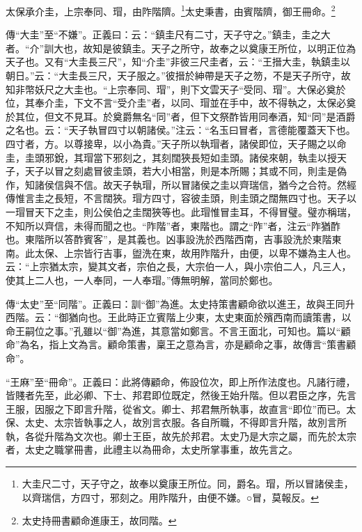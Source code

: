 太保承介圭，上宗奉同、瑁，由阼階隮。\footnote{大圭尺二寸，天子守之，故奉以奠康王所位。同，爵名。瑁，所以冒諸侯圭，以齊瑞信，方四寸，邪刻之。用阼階升，由便不嫌。○冒，莫報反。}太史秉書，由賓階隮，御王冊命。\footnote{太史持冊書顧命進康王，故同階。}

{\noindent\zhuan{}\fzbyks 傳“大圭”至“不嫌”。正義曰：云：“鎮圭尺有二寸，天子守之。”鎮圭，圭之大者。“介”訓大也，故知是彼鎮圭。天子之所守，故奉之以奠康王所位，以明正位為天子也。又有“大圭長三尺”，知“介圭”非彼三尺圭者，云：“王搢大圭，執鎮圭以朝日。”云：“大圭長三尺，天子服之。”彼搢於紳帶是天子之笏，不是天子所守，故知非幣妖尺之大圭也。“上宗奉同、瑁”，則下文雲天子“受同、瑁”。大保必奠於位，其奉介圭，下文不言“受介圭”者，以同、瑁並在手中，故不得執之，太保必奠於其位，但文不見耳。於奠爵無名“同”者，但下文祭酢皆用同奉酒，知“同”是酒爵之名也。云：“天子執冒四寸以朝諸侯。”注云：“名玉曰冒者，言德能覆蓋天下也。四寸者，方。以尊接卑，以小為貴。”天子所以執瑁者，諸侯即位，天子賜之以命圭，圭頭邪銳，其瑁當下邪刻之，其刻闊狹長短如圭頭。諸侯來朝，執圭以授天子，天子以冒之刻處冒彼圭頭，若大小相當，則是本所賜；其或不同，則圭是偽作，知諸侯信與不信。故天子執瑁，所以冒諸侯之圭以齊瑞信，猶今之合符。然經傳惟言圭之長短，不言闊狹。瑁方四寸，容彼圭頭，則圭頭之闊無四寸也。天子以一瑁冒天下之圭，則公侯伯之圭闊狹等也。此瑁惟冒圭耳，不得冒璧。璧亦稱瑞，不知所以齊信，未得而聞之也。“阼階”者，東階也。謂之“阼”者，注云“阼猶酢也。東階所以答酢賓客”，是其義也。凶事設洗於西階西南，吉事設洗於東階東南。此太保、上宗皆行吉事，盥洗在東，故用阼階升，由便，以卑不嫌為主人也。云：“上宗猶太宗，變其文者，宗伯之長，大宗伯一人，與小宗伯二人，凡三人，使其上二人也，一人奉同，一人奉瑁。”傳無明解，當同於鄭也。 \par}

{\noindent\zhuan{}\fzbyks 傳“太史”至“同階”。正義曰：訓“御”為進。太史持策書顧命欲以進王，故與王同升西階。云：“御猶向也。王此時正立賓階上少東，太史東面於殯西南而讀策書，以命王嗣位之事。”孔雖以“御”為進，其意當如鄭言。不言王面北，可知也。篇以“顧命”為名，指上文為言。顧命策書，稟王之意為言，亦是顧命之事，故傳言“策書顧命”。 \par}

{\noindent\shu{}\fzkt “王麻”至“冊命”。正義曰：此將傳顧命，佈設位次，即上所作法度也。凡諸行禮，皆賤者先至，此必卿、下士、邦君即位既定，然後王始升階。但以君臣之序，先言王服，因服之下即言升階，從省文。卿士、邦君無所執事，故直言“即位”而已。太保、太史、太宗皆執事之人，故別言衣服。各自所職，不得即言升階，故別言所執，各從升階為文次也。卿士王臣，故先於邦君。太史乃是大宗之屬，而先於太宗者，太史之職掌冊書，此禮主以為冊命，太史所掌事重，故先言之。 \par}

